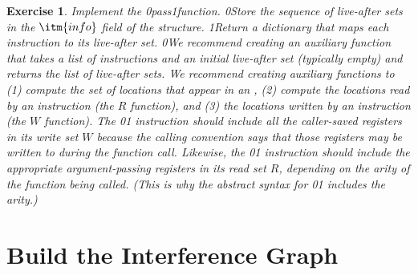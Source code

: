 \documentclass[7x10]{TimesAPriori_MIT}%
\def\racketEd{0}
\def\pythonEd{1}
\def\edition{1}
\def\xeightysixEd{0}
\def\riscvEd{1}
\def\architecture{1}
\newcommand\ifriscv[1]{\if\architecture\riscvEd{#1}\fi}
\newcommand\ifxeightsix[1]{\if\architecture\xeightysixEd{#1}\fi}
\newcommand{\racket}[1]{{\if\edition\racketEd{#1}\fi}}
\newcommand{\pythonColor}[0]{}
\newcommand{\python}[1]{{\if\edition\pythonEd\pythonColor #1\fi}}
\newtheorem{exercise}[theorem]{Exercise}
\numberwithin{theorem}{chapter}
\numberwithin{definition}{chapter}
\numberwithin{equation}{chapter}
\begin{document}
\begin{exercise}\normalfont\normalsize
  Implement the  \racket{pass}\python{function}.
\racket{Store the sequence of live-after sets in the $\itm{info}$
  field of the \code{Block} structure.}
%
\python{Return a dictionary that maps each instruction to its
  live-after set.}
%
\racket{We recommend creating an auxiliary function that takes a list
  of instructions and an initial live-after set (typically empty) and
  returns the list of live-after sets.}
%
We recommend creating auxiliary functions to (1) compute the set
of locations that appear in an \Arg{}, (2) compute the locations read
by an instruction (the $R$ function), and (3) the locations written by
an instruction (the $W$ function). The \ifxeightsix{}\ifriscv{} instruction should
include all the caller-saved registers in its write set $W$ because
the calling convention says that those registers may be written to
during the function call. Likewise, the \ifxeightsix{}\ifriscv{} instruction
should include the appropriate argument-passing registers in its
read set $R$, depending on the arity of the function being
called. (This is why the abstract syntax for \ifxeightsix{}\ifriscv{} includes the
arity.)
\end{exercise}


\section{Build the Interference Graph}
\label{sec:build-interference}
\end{document}
